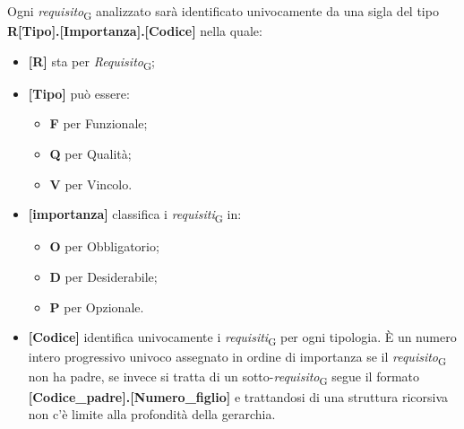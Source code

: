 Ogni \textit{requisito}\textsubscript{G} analizzato  sarà identificato univocamente da una sigla del tipo \\ \textbf{R[Tipo].[Importanza].[Codice]} nella quale:
\begin{itemize}
    \item \textbf{[R]} sta per \textit{Requisito}\textsubscript{G};
    \item \textbf{[Tipo]} può essere:
    \begin{itemize}
        \item \textbf{F} per Funzionale;
        \item \textbf{Q} per Qualità;
        \item \textbf{V} per Vincolo.
    \end{itemize}
    \item \textbf{[importanza]} classifica i \textit{requisiti}\textsubscript{G} in:
    \begin{itemize}
        \item \textbf{O} per Obbligatorio;
        \item \textbf{D} per Desiderabile;
        \item \textbf{P} per Opzionale.
    \end{itemize}
    \item \textbf{[Codice]} identifica univocamente i \textit{requisiti}\textsubscript{G} per ogni tipologia. È un numero intero progressivo univoco assegnato in ordine di importanza se il \textit{requisito}\textsubscript{G} non ha padre, se invece si tratta di un sotto-\textit{requisito}\textsubscript{G} segue il formato \textbf{[Codice\_padre].[Numero\_figlio]} e trattandosi di una struttura ricorsiva non c'è limite alla profondità della gerarchia.
\end{itemize}

